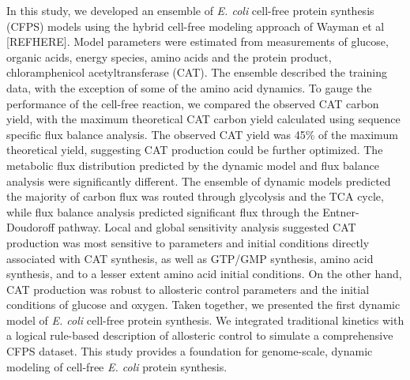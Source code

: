 \documentclass[12pt]{article}
\begin{document}
In this study, we developed an ensemble of \textit{E. coli} cell-free protein synthesis (CFPS) models using the hybrid cell-free modeling approach of Wayman et al [REFHERE].
Model parameters were estimated from measurements of glucose, organic acids, energy species, amino acids and the protein product, chloramphenicol acetyltransferase (CAT).
The ensemble described the training data, with the exception of some of the amino acid dynamics.
To gauge the performance of the cell-free reaction, we compared the observed CAT carbon yield, with the maximum theoretical CAT carbon yield calculated using sequence specific flux
balance analysis. The observed CAT yield was 45\% of the maximum theoretical yield, suggesting CAT production could be further optimized.
The metabolic flux distribution predicted by the dynamic model and flux balance analysis were significantly different.
The ensemble of dynamic models predicted the majority of carbon flux was routed through glycolysis and the TCA cycle,
while flux balance analysis predicted significant flux through the Entner-Doudoroff pathway.
Local and global sensitivity analysis suggested CAT production was most sensitive to parameters and initial conditions directly associated with CAT synthesis, as well as
GTP/GMP synthesis, amino acid synthesis, and to a lesser extent amino acid initial conditions.
On the other hand, CAT production was robust to allosteric control parameters and the initial conditions of glucose and oxygen.
Taken together, we presented the first dynamic model of \textit{E. coli} cell-free protein synthesis.
We integrated traditional kinetics with a logical rule-based description of allosteric control to simulate a comprehensive CFPS dataset.
This study provides a foundation for genome-scale, dynamic modeling of cell-free \textit{E. coli} protein synthesis.

\end{document}

